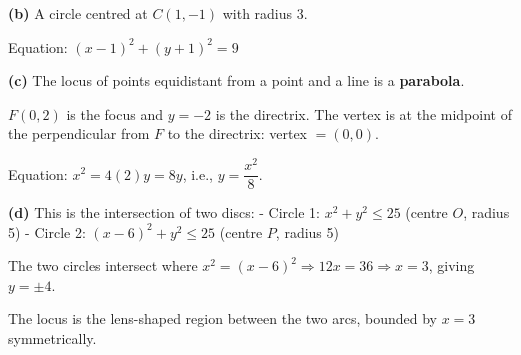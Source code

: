 \documentclass[addpoints]{exam}
\begin{document}
\begin{questions}
\begin{solution}[10cm]
\textbf{(b)} A circle centred at $C(1, -1)$ with radius 3.

Equation: $(x-1)^2 + (y+1)^2 = 9$

\textbf{(c)} The locus of points equidistant from a point and a line is a \textbf{parabola}.

$F(0,2)$ is the focus and $y = -2$ is the directrix. The vertex is at the midpoint of the perpendicular from $F$ to the directrix: vertex $= (0, 0)$.

Equation: $x^2 = 4(2)y = 8y$, i.e., $y = \dfrac{x^2}{8}$.

\textbf{(d)} This is the intersection of two discs:
- Circle 1: $x^2 + y^2 \leq 25$ (centre $O$, radius 5)
- Circle 2: $(x-6)^2 + y^2 \leq 25$ (centre $P$, radius 5)

The two circles intersect where $x^2 = (x-6)^2 \Rightarrow 12x = 36 \Rightarrow x = 3$, giving $y = \pm 4$.

The locus is the lens-shaped region between the two arcs, bounded by $x = 3$ symmetrically.
\end{solution}

\end{questions}
\end{document}
